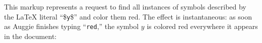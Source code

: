 This markup represents a request to find all instances of symbols described by the LaTeX literal ``\$\texttt{y}\$'' and color them red. The effect is instantaneous: as soon as Auggie finishes typing ``\texttt{red},'' the symbol $y$ is colored red everywhere it appears in the document: \\[1ex]

